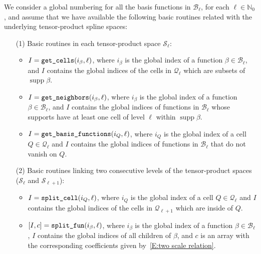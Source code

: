 \documentclass[12pt,a4paper,pdftex]{article}
\theoremstyle{plain}
\theoremstyle{definition}
\theoremstyle{remark}
\DeclareMathOperator{\supp}{supp}
\newcommand\NN{\mathbb N}
\newcommand\BB{\mathcal B}
\newcommand\QQ{\mathcal Q}
\newcommand\VV{\mathcal S}
\begin{document}
We consider a global numbering for all the basis functions in $\BB_\ell$, for each $\ell \in\NN_0$, and assume that we have available the following basic routines related with the underlying tensor-product spline spaces:
\begin{enumerate}
 \item[(1)] Basic routines in each tensor-product space $\VV_\ell$:
\begin{itemize}
 \item $I = \verb+get_cells+ (i_\beta,\ell)$, where $i_\beta$ is the global 
index of a function $\beta\in\BB_\ell$, and $I$ contains the global indices 
of the cells in $\QQ_{\ell}$ which are subsets of $\supp\beta$.
\item $I = \verb+get_neighbors+ (i_\beta,\ell)$, where $i_\beta$ is the global 
index of a function $\beta\in\BB_\ell$, and $I$ contains the global indices 
of functions in $\BB_{\ell}$ whose supports have at least one cell of level $\ell$ within $\supp\beta$.
\item $I = \verb+get_basis_functions+ (i_Q,\ell)$, where $i_Q$ is the global index of a cell $Q\in\QQ_\ell$ and $I$ contains the global indices 
of functions in $\BB_{\ell}$ that do not vanish on $Q$.
\end{itemize}
\item[(2)] Basic routines linking two consecutive levels of the tensor-product spaces ($\VV_\ell$ and $\VV_{\ell+1}$):
\begin{itemize}
\item $I = \verb+split_cell+ (i_Q,\ell)$, where $i_Q$ is the global index of a cell $Q\in\QQ_\ell$ and $I$ contains the global indices 
of the cells in $\QQ_{\ell+1}$ which are inside of $Q$.
\item $[I,c] = \verb+split_fun+ (i_\beta,\ell)$, where $i_\beta$ is the global 
index of a function $\beta\in\BB_\ell$, $I$ contains the global indices of all children of $\beta$, and $c$ 
is an array with the corresponding coefficients given by~\eqref{E:two scale relation}. 
\end{itemize}
\end{enumerate}
\end{document}
